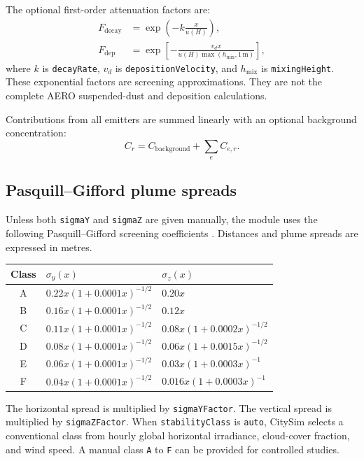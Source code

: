 \documentclass[11pt,a4paper]{article}
\newcommand{\code}[1]{\texttt{#1}}
\newcommand{\unit}[1]{\,\mathrm{#1}}
\newcommand{\toprule}{\hline}
\newcommand{\midrule}{\hline}
\newcommand{\bottomrule}{\hline}
\begin{document}
The optional first-order attenuation factors are:
\begin{align}
 F_{\mathrm{decay}} &= \exp\left(-k\frac{x}{u(H)}\right), \\
 F_{\mathrm{dep}} &=
 \exp\left[
   -\frac{v_d x}{u(H)\max(h_{\mathrm{mix}},1\unit{m})}
 \right],
 \label{eq:pollutant-optional-losses}
\end{align}
where $k$ is \code{decayRate}, $v_d$ is \code{depositionVelocity}, and
$h_{\mathrm{mix}}$ is \code{mixingHeight}. These exponential factors are
screening approximations. They are not the complete AERO suspended-dust and
deposition calculations.

Contributions from all emitters are summed linearly with an optional background
concentration:
\begin{equation}
  C_r = C_{\mathrm{background}} + \sum_e C_{e,r}.
\end{equation}

\subsection{Pasquill--Gifford plume spreads}

Unless both \code{sigmaY} and \code{sigmaZ} are given manually, the module uses
the following Pasquill--Gifford screening coefficients \cite{turner-workbook}.
Distances and plume spreads are expressed in metres.

\begin{center}
\small
\begin{tabular}{c l l}
\toprule
Class & $\sigma_y(x)$ & $\sigma_z(x)$ \\
\midrule
A & $0.22x(1+0.0001x)^{-1/2}$ & $0.20x$ \\
B & $0.16x(1+0.0001x)^{-1/2}$ & $0.12x$ \\
C & $0.11x(1+0.0001x)^{-1/2}$ & $0.08x(1+0.0002x)^{-1/2}$ \\
D & $0.08x(1+0.0001x)^{-1/2}$ & $0.06x(1+0.0015x)^{-1/2}$ \\
E & $0.06x(1+0.0001x)^{-1/2}$ & $0.03x(1+0.0003x)^{-1}$ \\
F & $0.04x(1+0.0001x)^{-1/2}$ & $0.016x(1+0.0003x)^{-1}$ \\
\bottomrule
\end{tabular}
\end{center}

The horizontal spread is multiplied by \code{sigmaYFactor}. The vertical
spread is multiplied by \code{sigmaZFactor}. When \code{stabilityClass} is
\code{auto}, CitySim selects a conventional class from hourly global horizontal
irradiance, cloud-cover fraction, and wind speed. A manual class \code{A} to
\code{F} can be provided for controlled studies.
\end{document}
